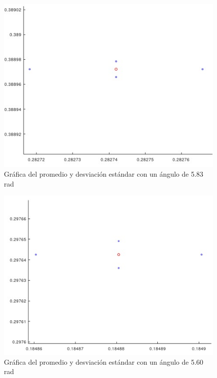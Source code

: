 \documentclass[a4paper, 12pt]{article}
\begin{document}
    \begin{figure}[ht!]
        \centering
        \includegraphics[width=12cm]{img/g7.jpeg}
        \caption{Gráfica del promedio y desviación estándar con un ángulo de 5.83 rad}
        \label{G7}
    \end{figure}

    \begin{figure}[ht!]
        \centering
        \includegraphics[width=12cm]{img/g8.jpeg}
        \caption{Gráfica del promedio y desviación estándar con un ángulo de 5.60 rad}
        \label{G8}
    \end{figure}
\end{document}
